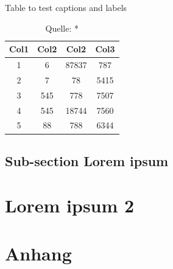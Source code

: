 \documentclass{hwz}
\begin{document}
\lipsum[2]

\begin{table}[h]
\centering
\caption{Table to test captions and labels}
\label{table:1}
\begin{tabular}{||c c c c||} 
 \hline
 Col1 & Col2 & Col2 & Col3 \\ [0.5ex] 
 \hline\hline
 1 & 6 & 87837 & 787 \\ 
 2 & 7 & 78 & 5415 \\
 3 & 545 & 778 & 7507 \\
 4 & 545 & 18744 & 7560 \\
 5 & 88 & 788 & 6344 \\ [1ex] 
 \hline
\end{tabular}
\caption*{Quelle: \cite{BundesamtfurStatistik2018Finanzierung}*}
\end{table}
\newpage

\subsection{Sub-section Lorem ipsum}

\lipsum[2]

\newpage

\section{Lorem ipsum 2}

\lipsum[2]

\newpage

\section{Anhang}


\newpage

\end{document}
